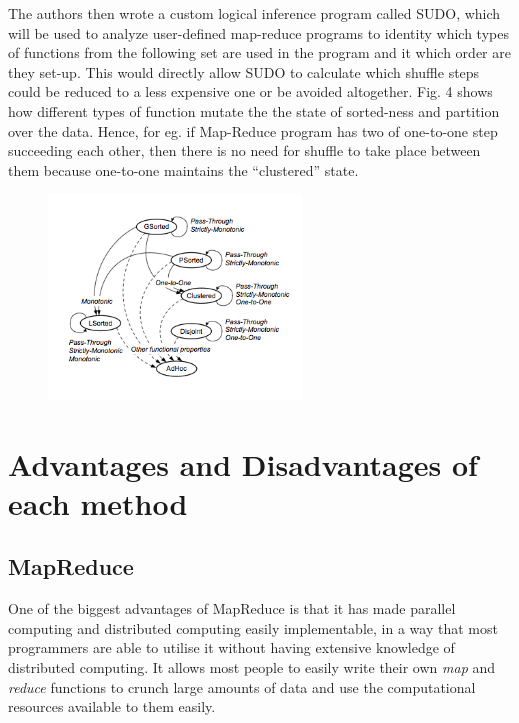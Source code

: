 \documentclass[]{article}
\begin{document}
The authors then wrote a custom logical inference program called SUDO, which will be used to analyze user-defined map-reduce programs to identity which types of functions from the following set are used in the program and it which order are they set-up. This would directly allow SUDO to calculate which shuffle steps could be reduced to a less expensive one or be avoided altogether. Fig. 4 shows how different types of function mutate the the state of sorted-ness and partition over the data. Hence, for eg. if Map-Reduce program has two of one-to-one step succeeding each other, then there is no need for shuffle to take place between them because one-to-one maintains the “clustered” state. 
\begin{figure}[here]
	\begin{center}
		\includegraphics[width=0.6\textwidth]{parallel12.png}
		\label{fig:parallel12}
	\end{center}
\end{figure}


\section{Advantages and Disadvantages of each method}
\subsection{MapReduce}
One of the biggest advantages of MapReduce is that it has made parallel computing and distributed computing easily implementable, in a way that most programmers are able to utilise it without having extensive knowledge of distributed computing. It allows most people to easily write their own \emph{map} and \emph{reduce} functions to crunch large amounts of data and use the computational resources available to them easily. \\
\end{document}
